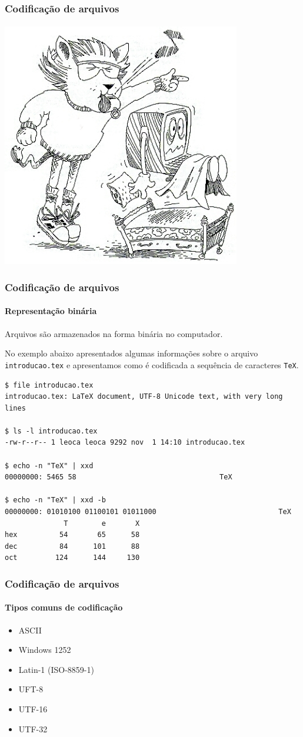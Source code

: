 \begin{frame}
\frametitle{Codificação de arquivos}
\framesubtitle{}
\centering
\includegraphics[width=0.4\linewidth]{figures/TexLionWhistle.jpg}
\end{frame}

\begin{frame}[fragile]
\frametitle{Codificação de arquivos}
\framesubtitle{Representação binária}
Arquivos são armazenados na forma binária no computador. 

No exemplo abaixo apresentados algumas informações sobre o arquivo \texttt{introducao.tex}
e apresentamos como é codificada a sequência de caracteres \texttt{TeX}.
\begin{footnotesize}
\begin{verbatim}
$ file introducao.tex 
introducao.tex: LaTeX document, UTF-8 Unicode text, with very long lines

$ ls -l introducao.tex
-rw-r--r-- 1 leoca leoca 9292 nov  1 14:10 introducao.tex

$ echo -n "TeX" | xxd
00000000: 5465 58                                  TeX

$ echo -n "TeX" | xxd -b
00000000: 01010100 01100101 01011000                             TeX
              T        e       X
hex          54       65      58 
dec          84      101      88
oct         124      144     130
\end{verbatim}
\end{footnotesize}
\end{frame}

\begin{frame}
\frametitle{Codificação de arquivos}
\framesubtitle{Tipos comuns de codificação}
  \begin{itemize}
  \item ASCII
  \item Windows 1252 
  \item Latin-1 (ISO-8859-1)
  \item UFT-8
  \item UTF-16
  \item UTF-32
  \end{itemize}
\end{frame}

